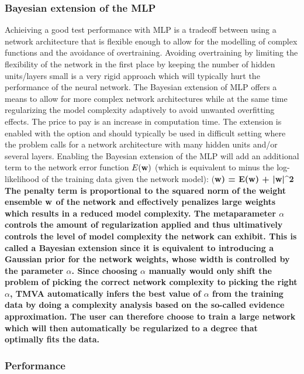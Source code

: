 \subsubsection{Bayesian extension of the MLP}
\label{sec:ann:bayes}
Achieiving a good test performance with MLP is a tradeoff between using a network architecture that is flexible enough to allow for the modelling of complex functions and the avoidance of overtraining. Avoiding overtraining by limiting the flexibility of the network in the first place by keeping the number of hidden units/layers small is a very rigid approach which will typically hurt the performance of the neural network. The Bayesian extension of MLP offers a means to allow for more complex network architectures while at the same time regularizing the model complexity adaptively to avoid unwanted overfitting effects. The price to pay is an increase in computation time. The extension is enabled with the option  and should typically be used in difficult setting where the problem calls for a network architecture with many hidden units and/or several layers.
Enabling the Bayesian extension of the MLP will add an additional term to the network error function $E(\bf w)$ (which is equivalent to minus the log-likelihood of the training data given the network model):
\beq
  \label{eq:mlp:penalty}
	(\bf w) = E(\bf w) + \alpha\bf |w|^2
\eeq
The penalty term is proportional to the squared norm of the weight ensemble $\bf w$ of the network and effectively penalizes large weights which results in a reduced model complexity. The metaparameter $\alpha$ controls the amount of regularization applied and thus ultimatively controls the level of model complexity the network can exhibit. This is called a Bayesian extension since it is equivalent to introducing a Gaussian prior for the network weights, whose width is controlled by the parameter $\alpha$. Since choosing $\alpha$ manually would only shift the problem of picking the correct network complexity to picking the right $\alpha$, TMVA automatically infers the best value of $\alpha$ from the training data by doing a complexity analysis based on the so-called evidence approximation. The user can therefore choose to train a large network which will then automatically be regularized to a degree that optimally fits the data.
	
\subsubsection{Performance}
\label{sec:ann:perf}

